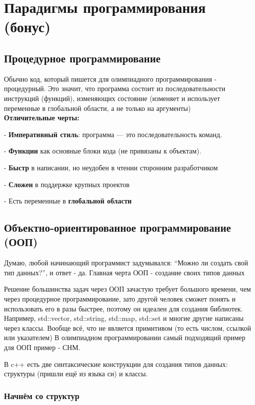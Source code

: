\section{Парадигмы программирования (бонус)}

\subsection{Процедурное программирование}
Обычно код, который пишется для олимпиадного программирования - процедурный.
Это значит, что программа состоит из последовательности инструкций (функций), изменяющих состояние
(изменяет и использует переменные в глобальной области, а не только на аргументы)\\
\textbf{Отличительные черты:}

- \textbf{Императивный стиль}: программа — это последовательность команд.

- \textbf{Функции} как основные блоки кода (не привязаны к объектам).

- \textbf{Быстр} в написании, но неудобен в чтении сторонним разработчиком

- \textbf{Сложен} в поддержке крупных проектов

- Есть переменные в \textbf{глобальной области}

\subsection{Объектно-ориентированное программирование (ООП)}
Думаю, любой начинающий программист задумывался: ``Можно ли создать свой тип данных?'', и ответ - да.
Главная черта ООП - создание своих типов данных

Решение большинства задач через ООП зачастую требует большого времени, чем через процедурное программирование,
зато другой человек сможет понять и использовать его в разы быстрее, поэтому он идеален для создания библиотек.
Например, std::vector, std::string, std::map, std::set и многие другие написаны через классы.
Вообще всё, что не является примитивом (то есть числом, ссылкой или указателем)
В олимпиадном программировании самый подходящий пример для ООП пример - СНМ.

В c++ есть две синтаксические конструкции для создания типов данных: структуры (пришли ещё из языка си) и классы.

\vspace{0px}
\subsubsection{Начнём со структур}

